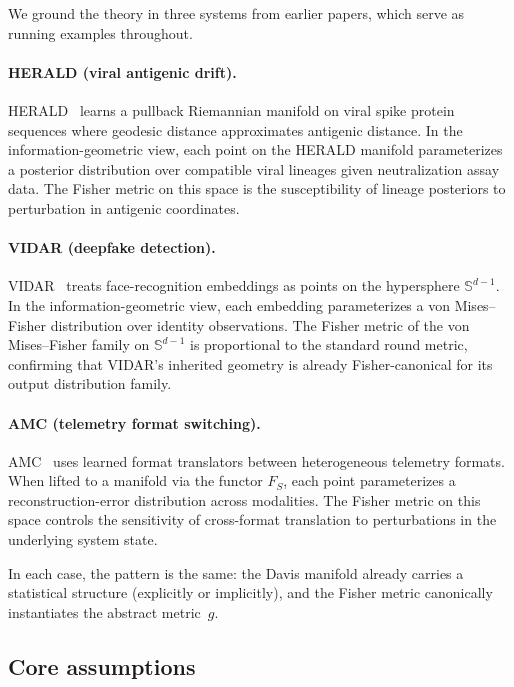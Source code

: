 \documentclass[11pt]{article}
\theoremstyle{remark}
\begin{document}
We ground the theory in three systems from earlier papers, which serve as
running examples throughout.

\paragraph{HERALD (viral antigenic drift).}
HERALD~\cite{davis2025manifold} learns a pullback Riemannian manifold on viral
spike protein sequences where geodesic distance approximates antigenic distance.
In the information-geometric view, each point on the HERALD manifold
parameterizes a posterior distribution over compatible viral lineages given
neutralization assay data.  The Fisher metric on this space is the
susceptibility of lineage posteriors to perturbation in antigenic coordinates.

\paragraph{VIDAR (deepfake detection).}
VIDAR~\cite{davis2025manifold} treats face-recognition embeddings as points on
the hypersphere $\mathbb{S}^{d-1}$.  In the information-geometric view, each
embedding parameterizes a von Mises--Fisher distribution over identity
observations.  The Fisher metric of the von Mises--Fisher family on
$\mathbb{S}^{d-1}$ is proportional to the standard round metric, confirming
that VIDAR's inherited geometry is already Fisher-canonical for its output
distribution family.

\paragraph{AMC (telemetry format switching).}
AMC~\cite{davis2025sameness} uses learned format translators between
heterogeneous telemetry formats.  When lifted to a manifold via the functor
$F_S$, each point parameterizes a reconstruction-error distribution across
modalities.  The Fisher metric on this space controls the sensitivity of
cross-format translation to perturbations in the underlying system state.

In each case, the pattern is the same: the Davis manifold already carries a
statistical structure (explicitly or implicitly), and the Fisher metric
canonically instantiates the abstract metric~$g$.

\subsection{Core assumptions}\label{subsec:assumptions}
\end{document}
